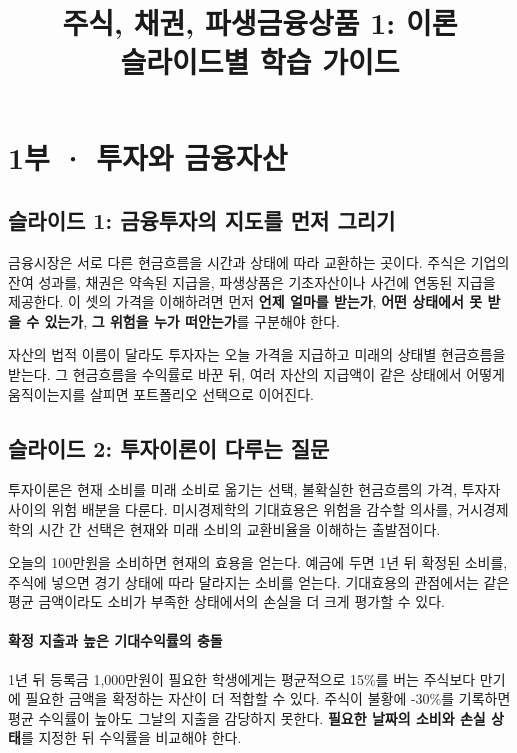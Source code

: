 \documentclass[11pt,a4paper]{article}
\title{주식, 채권, 파생금융상품 1: 이론\\\large 슬라이드별 학습 가이드}
\author{}
\date{}
\begin{document}
\maketitle
\tableofcontents
\clearpage

\section{1부 · 투자와 금융자산}

\subsection{슬라이드 1: 금융투자의 지도를 먼저 그리기}

금융시장은 서로 다른 현금흐름을 시간과 상태에 따라 교환하는 곳이다. 주식은 기업의 잔여 성과를, 채권은 약속된 지급을, 파생상품은 기초자산이나 사건에 연동된 지급을 제공한다. 이 셋의 가격을 이해하려면 먼저 \textbf{언제 얼마를 받는가}, \textbf{어떤 상태에서 못 받을 수 있는가}, \textbf{그 위험을 누가 떠안는가}를 구분해야 한다.
\par

자산의 법적 이름이 달라도 투자자는 오늘 가격을 지급하고 미래의 상태별 현금흐름을 받는다. 그 현금흐름을 수익률로 바꾼 뒤, 여러 자산의 지급액이 같은 상태에서 어떻게 움직이는지를 살피면 포트폴리오 선택으로 이어진다.
\par

\subsection{슬라이드 2: 투자이론이 다루는 질문}

투자이론은 현재 소비를 미래 소비로 옮기는 선택, 불확실한 현금흐름의 가격, 투자자 사이의 위험 배분을 다룬다. 미시경제학의 기대효용은 위험을 감수할 의사를, 거시경제학의 시간 간 선택은 현재와 미래 소비의 교환비율을 이해하는 출발점이다.
\par

오늘의 100만원을 소비하면 현재의 효용을 얻는다. 예금에 두면 1년 뒤 확정된 소비를, 주식에 넣으면 경기 상태에 따라 달라지는 소비를 얻는다. 기대효용의 관점에서는 같은 평균 금액이라도 소비가 부족한 상태에서의 손실을 더 크게 평가할 수 있다.
\par

\paragraph{확정 지출과 높은 기대수익률의 충돌}

1년 뒤 등록금 1,000만원이 필요한 학생에게는 평균적으로 15\%를 버는 주식보다 만기에 필요한 금액을 확정하는 자산이 더 적합할 수 있다. 주식이 불황에 -30\%를 기록하면 평균 수익률이 높아도 그날의 지출을 감당하지 못한다. \textbf{필요한 날짜의 소비와 손실 상태}를 지정한 뒤 수익률을 비교해야 한다.
\par
\end{document}
